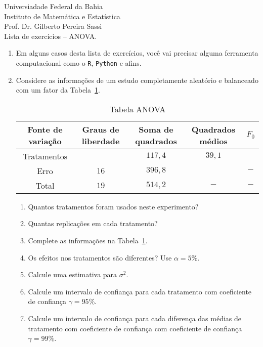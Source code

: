 \documentclass[11pt, a4paper]{article}
\begin{document}
\begin{center}
Universiadade Federal da Bahia\\
Instituto de Matemática e Estatística\\
Prof. Dr. Gilberto Pereira Sassi\\
\vspace{1cm}
Lista de exercícios -- ANOVA.
\vspace{1cm}
\end{center}

\begin{enumerate}
	\item[] Em alguns casos desta lista de exercícios, você vai precisar alguma ferramenta computacional como o \texttt{R}, \texttt{Python} e afins.
	
	\item Considere as informações de um estudo completamente aleatório e balanceado com um fator da Tabela~\ref{tab:anova-ex1}.
	\begin{table}[htbp]
		\centering
		\begin{tabular}{c|c|c|c|c}
			\toprule[0.05cm]
			Fonte de variação & Graus de liberdade & Soma de quadrados & Quadrados médios & $F_0$\\ \midrule[0.025cm]
			Tratamentos & & $117,4$ & $39,1$ & \\ \midrule[0.025cm]
			Erro & $16$ & $396,8$ & &  $-$\\ \midrule[0.025cm]
			Total & $19$ & $514,2$ & $-$ & $-$ \\
			\bottomrule[0.05cm]
		\end{tabular}
		\caption{Tabela ANOVA}
		\label{tab:anova-ex1}
	\end{table}
	\begin{enumerate}
		\item Quantos tratamentos foram usados neste experimento?
		\item Quantas replicações em cada tratamento?
		\item Complete as informações na Tabela~\ref{tab:anova-ex1}. 
		\item Os efeitos nos tratamentos são diferentes? Use $\alpha=5\%$. 
		\item Calcule uma estimativa para $\sigma^2$.
		\item Calcule um intervalo de confiança para cada tratamento com coeficiente de confiança $\gamma=95\%$.
		\item Calcule um intervalo de confiança para cada diferença das médias de tratamento com coeficiente de confiança com coeficiente de confiança $\gamma=99\%$.
	\end{enumerate}


\end{enumerate}
\end{document}
